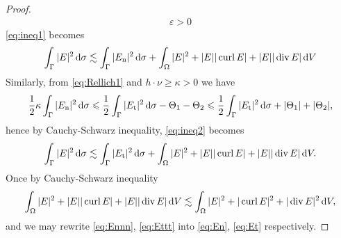 \begin{proof}
\begin{align*}
    \varepsilon>0
  \end{align*}
  \eqref{eq:ineq1} becomes
  \begin{align}
    \int_{\Gamma}|E|^2\,\text{d}\sigma\lesssim\int_{\Gamma}|E_{\text{n}}|^2\,\text{d}\sigma+\int_{\Omega}|E|^2+|E||\operatorname{curl} E|+|E||\operatorname{div} E|\,\text{d}V
    \label{eq:Ennn}
  \end{align}
  Similarly, from \eqref{eq:Rellich1} and $h\cdot\nu\geqslant\kappa>0$ we have
  \begin{align}\label{eq:ineq2}
    \frac{1}{2}\kappa\int_{\Gamma}|E_{\text{n}}|^2\,\text{d}\sigma\leqslant \frac{1}{2}\int_{\Gamma}|E_{\text{t}}|^2\,\text{d}\sigma-\Theta_1-\Theta_2\leqslant\frac{1}{2}\int_{\Gamma}|E_{\text{t}}|^2\,\text{d}\sigma+|\Theta_1|+|\Theta_2|,
  \end{align}
  hence by Cauchy-Schwarz inequality, \eqref{eq:ineq2} becomes
  \begin{align}
    \int_{\Gamma}|E|^2\,\text{d}\sigma\lesssim\int_{\Gamma}|E_{\text{t}}|^2\,\text{d}\sigma+\int_{\Omega}|E|^2+|E||\operatorname{curl} E|+|E||\operatorname{div} E|\,\text{d}V
    \label{eq:Ettt}.
  \end{align}
  Once by Cauchy-Schwarz inequality 
  \begin{align*}
    \int_{\Omega}|E|^2+|E||\operatorname{curl} E|+|E||\operatorname{div} E|\,\text{d}V\lesssim\int_{\Omega}|E|^2+|\operatorname{curl} E|^2+
    |\operatorname{div} E|^2\,\text{d}V,
  \end{align*}
  and we may rewrite \eqref{eq:Ennn}, \eqref{eq:Ettt} into \eqref{eq:En}, 
  \eqref{eq:Et} respectively.
\end{proof}

